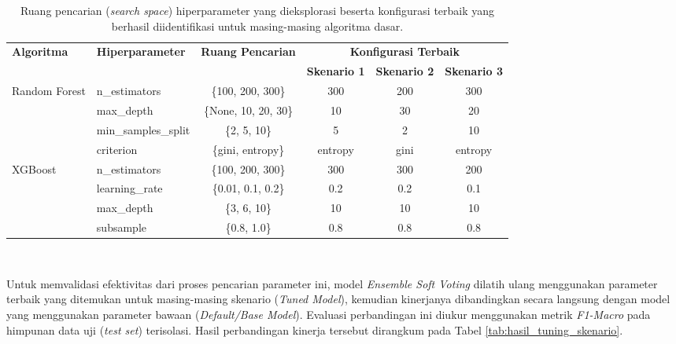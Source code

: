 \begin{table}[htbp]
\centering
\footnotesize
\caption{Ruang pencarian (\textit{search space}) hiperparameter yang dieksplorasi beserta konfigurasi terbaik yang berhasil diidentifikasi untuk masing-masing algoritma dasar.}
\label{tab:hyperparameter_grid}
\begin{tabular}{llcccc}
\toprule
\multirow{2}{*}{\textbf{Algoritma}} & \multirow{2}{*}{\textbf{Hiperparameter}} & \multirow{2}{*}{\textbf{Ruang Pencarian}} & \multicolumn{3}{c}{\textbf{Konfigurasi Terbaik}} \\ \cmidrule(lr){4-6} 
 &  &  & \textbf{Skenario 1} & \textbf{Skenario 2} & \textbf{Skenario 3} \\ \midrule
\multirow{4}{*}{Random Forest} & n\_estimators & \{100, 200, 300\} & 300 & 200 & 300 \\
 & max\_depth & \{None, 10, 20, 30\} & 10 & 30 & 20 \\
 & min\_samples\_split & \{2, 5, 10\} & 5 & 2 & 10 \\
 & criterion & \{gini, entropy\} & entropy & gini & entropy \\ \midrule
\multirow{4}{*}{XGBoost} & n\_estimators & \{100, 200, 300\} & 300 & 300 & 200 \\
 & learning\_rate & \{0.01, 0.1, 0.2\} & 0.2 & 0.2 & 0.1 \\
 & max\_depth & \{3, 6, 10\} & 10 & 10 & 10 \\
 & subsample & \{0.8, 1.0\} & 0.8 & 0.8 & 0.8 \\ \bottomrule
\end{tabular}%
\\ \vspace{0.2cm}
\end{table}

Untuk memvalidasi efektivitas dari proses pencarian parameter ini, model \textit{Ensemble Soft Voting} dilatih ulang menggunakan parameter terbaik yang ditemukan untuk masing-masing skenario (\textit{Tuned Model}), kemudian kinerjanya dibandingkan secara langsung dengan model yang menggunakan parameter bawaan (\textit{Default/Base Model}). Evaluasi perbandingan ini diukur menggunakan metrik \textit{F1-Macro} pada himpunan data uji (\textit{test set}) terisolasi. Hasil perbandingan kinerja tersebut dirangkum pada Tabel \ref{tab:hasil_tuning_skenario}.


